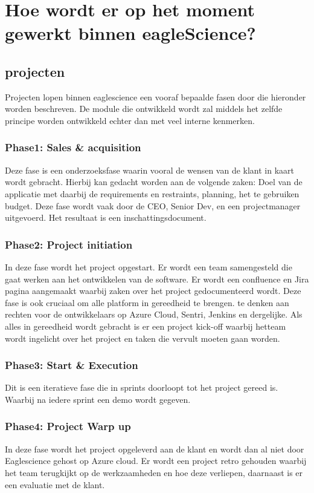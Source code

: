 \section{Hoe wordt er op het moment gewerkt binnen eagleScience?}
\subsection{projecten}
Projecten lopen binnen eaglescience een vooraf bepaalde fasen door die hieronder worden beschreven. De module die ontwikkeld wordt zal middels het zelfde principe worden ontwikkeld echter dan met veel interne kenmerken.
\subsubsection{Phase1: Sales \& acquisition}
Deze fase is een onderzoeksfase waarin vooral de wensen van de klant in kaart wordt gebracht. Hierbij kan gedacht worden aan de volgende zaken: Doel van de applicatie met daarbij de requirements en restraints, planning, het te gebruiken budget. Deze fase wordt vaak door de CEO, Senior Dev, en een projectmanager uitgevoerd. Het resultaat is een inschattingsdocument.
\subsubsection{Phase2: Project initiation}
In deze fase wordt het project opgestart. Er wordt een team samengesteld die gaat werken aan het ontwikkelen van de software. Er wordt een confluence en Jira pagina aangemaakt waarbij zaken over het project gedocumenteerd wordt. Deze fase is ook cruciaal om alle platform in gereedheid te brengen. te denken aan rechten voor de ontwikkelaars op Azure Cloud, Sentri, Jenkins en dergelijke. Als alles in gereedheid wordt gebracht is er een project kick-off waarbij hetteam wordt ingelicht over het project en taken die vervult moeten gaan worden.
\subsubsection{Phase3: Start \& Execution}
Dit is een iteratieve fase die in sprints doorloopt tot het project gereed is. Waarbij na iedere sprint een demo wordt gegeven.
\subsubsection{Phase4: Project Warp up}
In deze fase wordt het project opgeleverd aan de klant en wordt dan al niet door Eaglescience gehost op Azure cloud. Er wordt een project retro gehouden waarbij het team terugkijkt op de werkzaamheden en hoe deze verliepen, daarnaast is er een evaluatie met de klant.
